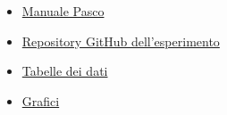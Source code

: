 {\fontsize{12}{14}\selectfont 

\begin{itemize}
    \item \href{https://cdn.pasco.com/product_document/Basic-Electrostatics-Sys-Manual-ES-9080B.pdf}{Manuale Pasco}\label{link:pascomanual}
    \item \href{https://github.com/Vayxen/Lab2-Elettrostatica}{Repository GitHub dell'esperimento}
    \item \href{https://github.com/Vayxen/Lab2-Elettrostatica/tree/main/tables}{Tabelle dei dati}
    \item \href{https://github.com/Vayxen/Lab2-Elettrostatica/tree/main/grafici}{Grafici}
\end{itemize}

\par}